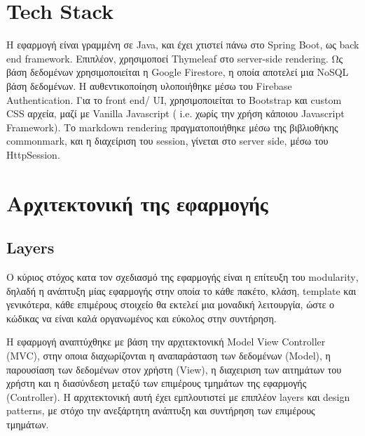 \documentclass{article}
\begin{document}
\section{\foreignlanguage{english}{Tech Stack}}
Η εφαρμογή είναι γραμμένη σε \foreignlanguage{english}{Java}, και έχει χτιστεί πάνω στο \foreignlanguage{english}{Spring Boot}, ως \foreignlanguage{english}{back end framework}. Επιπλέον, χρησιμοποεί \foreignlanguage{english}{Thymeleaf} στο \foreignlanguage{english}{server-side rendering}. Ως βάση δεδομένων χρησιμοποιείται η \foreignlanguage{english}{Google Firestore}, η οποία αποτελεί μια \foreignlanguage{english}{NoSQL} βάση δεδομένων. Η αυθεντικοποίηση υλοποιήθηκε μέσω του \foreignlanguage{english}{Firebase Authentication}. Για το \foreignlanguage{english}{front end/ UI}, χρησιμοποιείται το \foreignlanguage{english}{Bootstrap} και \foreignlanguage{english}{custom CSS} αρχεία, μαζί με \foreignlanguage{english}{Vanilla Javascript ( i.e.} χωρίς την χρήση κάποιου \foreignlanguage{english}{Javascript Framework}). Tο \foreignlanguage{english}{markdown rendering} πραγματοποιήθηκε μέσω της βιβλιοθήκης \foreignlanguage{english}{commonmark}, και η διαχείριση του \foreignlanguage{english}{session}, γίνεται στο \foreignlanguage{english}{server side}, μέσω του \foreignlanguage{english}{HttpSession}.

\newpage

\section{Αρχιτεκτονική της εφαρμογής}
\subsection{\foreignlanguage{english}{Layers}}
Ο κύριος στόχος κατα τον σχεδιασμό της εφαρμογής είναι η επίτευξη του \foreignlanguage{english}{modularity}, δηλαδή η ανάπτυξη μίας εφαρμογής στην οποία το κάθε πακέτο, κλάση, \foreignlanguage{english}{template} και γενικότερα, κάθε επιμέρους στοιχείο θα εκτελεί μια μοναδική λειτουργία, ώστε ο κώδικας να είναι καλά οργανωμένος και εύκολος στην συντήρηση.

Η εφαρμογή αναπτύχθηκε με βάση την αρχιτεκτονική \foreignlanguage{english}{Model View Controller (MVC)}, στην οποια διαχωρίζονται η αναπαράσταση των δεδομένων \foreignlanguage{english}{(Model)}, η παρουσίαση των δεδομένων στον χρήστη \foreignlanguage{english}{(View)}, η διαχειριση των αιτημάτων του χρήστη και η διασύνδεση μεταξύ των επιμέρους τμημάτων της εφαρμογής \foreignlanguage{english}{(Controller)}. H αρχιτεκτονική αυτή έχει εμπλουτιστεί με επιπλέον \foreignlanguage{english}{layers} και \foreignlanguage{english}{design patterns}, με στόχο την ανεξάρτητη ανάπτυξη και συντήρηση των επιμέρους τμημάτων.
\end{document}
